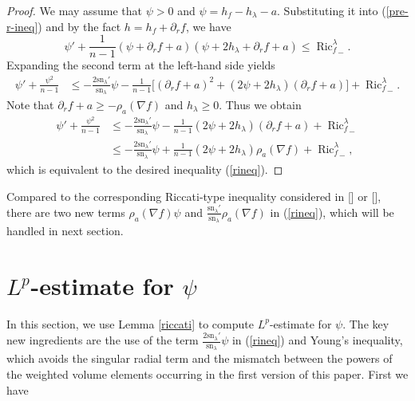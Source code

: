 \documentclass[11pt]{amsart}
\numberwithin{equation}{section}
\newcommand{\sn}{\mathrm{sn}}
\begin{document}
\begin{proof}
	We may assume that $\psi>0$ and $\psi=h_f-h_\lambda-a$.  Substituting  it into (\ref{pre-r-ineq}) and by the fact  $h=h_f+\partial_rf$,  we have
	\[
	\psi'+\frac{1}{n-1}(\psi+\partial_rf+a)(\psi+2h_\lambda+\partial_rf+a)\leq {\operatorname{Ric}_f^\lambda}_-.
	\]
	Expanding the second  term  at the  left-hand side yields
	\begin{align*}
		\psi'+\frac{\psi^2}{n-1}&\leq -\frac{2\sn_\lambda'}{\sn_\lambda}\psi-\frac{1}{n-1}\big[(\partial_rf+a)^2+(2\psi+2h_\lambda)(\partial_rf+a)\big]+{\operatorname{Ric}_f^\lambda}_-.
	\end{align*}
Note that  $\partial_rf+a\geq -\rho_a(\nabla f)$ and $h_\lambda\geq 0$.   Thus we obtain
\begin{align*}
	\psi'+\frac{\psi^2}{n-1}&\leq -\frac{2\sn_\lambda'}{\sn_\lambda}\psi-\frac{1}{n-1}(2\psi+2h_\lambda)(\partial_rf+a)+{\operatorname{Ric}_f^\lambda}_-\\
	&\leq -\frac{2\sn_\lambda'}{\sn_\lambda}\psi+\frac{1}{n-1}(2\psi+2h_\lambda)\rho_a(\nabla f)+{\operatorname{Ric}_f^\lambda}_-,
\end{align*}
which is equivalent to the desired inequality (\ref{rineq}).
\end{proof}

Compared to the corresponding  Riccati-type inequality considered  in [\cite{WW}] or  [\cite{Wu}],  there are  two new terms $\rho_a(\nabla f)\psi$ and $\frac{\sn_\lambda'}{\sn_\lambda}\rho_a(\nabla f)$ in (\ref{rineq}), which will be handled  in next section.

\section{$L^p$-estimate  for $\psi$}\label{sec3}

In this section, we use Lemma \ref{riccati} to compute   $L^p$-estimate  for $\psi$. The key new ingredients are the use of the term $\frac{2\sn_\lambda'}{\sn_\lambda}\psi$ in (\ref{rineq}) and Young's inequality, which avoids the singular radial term and the mismatch between the powers of the weighted volume elements occurring in the first version of this paper. First we have
\end{document}
